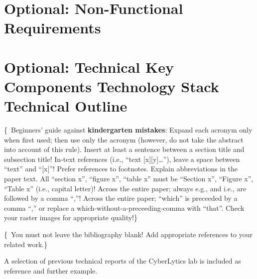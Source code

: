 \documentclass[conference,a4paper,flushend]{cs-techrep}
\begin{document}
\section{Optional: Non-Functional Requirements}
\lipsum[3]

\section{Optional: Technical Key Components \textbar{} Technology Stack \textbar{} Technical Outline}
\lipsum[4]

\vspace{\baselineskip}
\{\,\faWarning{} Beginners' guide against \textbf{kindergarten mistakes}:
Expand each acronym only when first used; then use only the acronym (however, do not take the abstract into account of this rule).
Insert at least a sentence between a section title and subsection title!
In-text references (i.e., \enquote{text [x][y]\ldots{}}), leave a space between \enquote{text} and \enquote{[x]}!
Prefer references to footnotes.
Explain abbreviations in the paper text.
All \enquote{section x}, \enquote{figure x}, \enquote{table x} must be \enquote{Section x}, \enquote{Figure x}, \enquote{Table x} (i.e., capital letter)!
Across the entire paper; always e.g., and i.e., are followed by a comma \enquote{,}!
Across the entire paper; \enquote{which} is preceeded by a comma \enquote{,} or replace a which-without-a-preceeding-comma with \enquote{that}.
Check your raster images for appropriate quality!\}

\vspace{\baselineskip}
\{\,\faWarning{} You must not leave the bibliography blank! Add appropriate references to your related work.\}

A selection of previous technical reports of the CyberLytics lab
%
%
\cite{%
ModA-TR-2025WS-BDT-TeamRot-VoteVibe,%
ModA-TR-2025WS-BDT-TeamBlau-MuskMonitor,%
ModA-TR-2024SS-CCT-TeamGruen-CloudDice,%
ModA-TR-2024SS-BCN-TeamCyan-SkillIssue,%
ModA-TR-2024SS-BCN-TeamGelb-GoalGuru,%
ModA-TR-2024SS-BCN-TeamWeiss-InfluenzaConnect,%
ModA-TR-2024SS-BCN-TeamGruen-NanoVend,%
ModA-TR-2024SS-BCN-TeamRot-StockSentinel,%
ModA-TR-2024SS-WAE-TeamCyan-Connect4IfYouCan,%
ModA-TR-2024SS-WAE-TeamWeiss-Geodingens,%
ModA-TR-2024SS-WAE-TeamGruen-MunchMunch,%
ModA-TR-2023SS-WAE-TeamWeiss-Neunerln,%
ModA-TR-2023SS-BDCC-TeamRot-CompVisPipeline,%
ModA-TR-2023SS-BDCC-TeamBlau-NauticalNonsense,%
ModA-TR-2023SS-BCN-TeamGruen-TorpedoTactics,%
ModA-TR-2023SS-BCN-TeamCyan-Stockbird,%
ModA-TR-2023SS-BCN-TeamBlau-FancyChess,%
ModA-TR-2023WS-SWT-TeamRot-SGDb,%
ModA-TR-2023WS-SWT-TeamGruen-OPCUANetzwerk,%
ModA-TR-2022SS-WAE-TeamWeiss-WoIstMeinGeld,%
ModA-TR-2022SS-BDCC-TeamWeiss-TwitterDash,%
ModA-TR-2022SS-BDCC-TeamRot-Reddiment,%
ModA-TR-2022SS-BDCC-TeamGruen-ExplosionGuy,%
ModA-TR-2022SS-BDCC-TeamCyan-OTHWiki,%
ModA-TR-2022WS-SWT-TeamGruen-Graphvio,%
ModA-TR-2021SS-WAE-TeamWeiss-CovidDashboard,%
ModA-TR-2021SS-WAE-TeamRot-FireForceDefense,%
ModA-TR-2021SS-WAE-TeamGruen-MedPlanner}
%
is included as reference and further example.

\printbibliography[notcategory=selfref]
\end{document}

